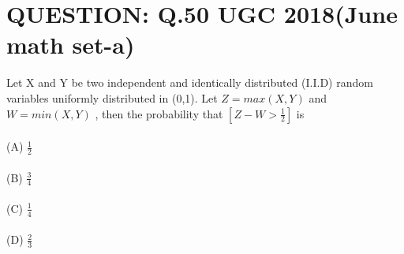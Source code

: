 \documentclass[journal,12pt,twocolumn]{IEEEtran}
\begin{document}
\section{QUESTION: Q.50 UGC 2018(June math set-a)}
Let X and Y be two independent and identically distributed (I.I.D) random variables uniformly distributed in (0,1). Let $Z = max(X,Y)$ and $W = min(X,Y)$ , then the probability that $[Z-W >\frac{1}{2}]$ is\\
\\(A) $\frac{1}{2}$\\
\\(B) $\frac{3}{4}$\\
\\(C) $\frac{1}{4}$\\
\\(D) $\frac{2}{3}$
\end{document}
